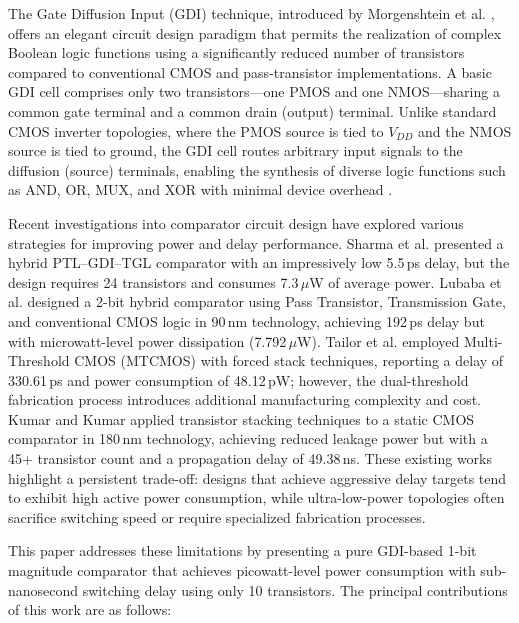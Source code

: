 \documentclass[final,5p,times,twocolumn]{elsarticle}
\begin{document}
The Gate Diffusion Input (GDI) technique, introduced by Morgenshtein et al. \cite{morgenshtein2002}, offers an elegant circuit design paradigm that permits the realization of complex Boolean logic functions using a significantly reduced number of transistors compared to conventional CMOS and pass-transistor implementations. A basic GDI cell comprises only two transistors---one PMOS and one NMOS---sharing a common gate terminal and a common drain (output) terminal. Unlike standard CMOS inverter topologies, where the PMOS source is tied to $V_{DD}$ and the NMOS source is tied to ground, the GDI cell routes arbitrary input signals to the diffusion (source) terminals, enabling the synthesis of diverse logic functions such as AND, OR, MUX, and XOR with minimal device overhead \cite{morgenshtein2002,morgenshtein2014}.

Recent investigations into comparator circuit design have explored various strategies for improving power and delay performance. Sharma et al. \cite{sharma2025} presented a hybrid PTL--GDI--TGL comparator with an impressively low 5.5\,ps delay, but the design requires 24 transistors and consumes 7.3\,$\mu$W of average power. Lubaba et al. \cite{lubaba2020} designed a 2-bit hybrid comparator using Pass Transistor, Transmission Gate, and conventional CMOS logic in 90\,nm technology, achieving 192\,ps delay but with microwatt-level power dissipation (7.792\,$\mu$W). Tailor et al. \cite{tailor2019} employed Multi-Threshold CMOS (MTCMOS) with forced stack techniques, reporting a delay of 330.61\,ps and power consumption of 48.12\,pW; however, the dual-threshold fabrication process introduces additional manufacturing complexity and cost. Kumar and Kumar \cite{kumar2017} applied transistor stacking techniques to a static CMOS comparator in 180\,nm technology, achieving reduced leakage power but with a 45+ transistor count and a propagation delay of 49.38\,ns. These existing works highlight a persistent trade-off: designs that achieve aggressive delay targets tend to exhibit high active power consumption, while ultra-low-power topologies often sacrifice switching speed or require specialized fabrication processes.

This paper addresses these limitations by presenting a pure GDI-based 1-bit magnitude comparator that achieves picowatt-level power consumption with sub-nanosecond switching delay using only 10 transistors. The principal contributions of this work are as follows:
\end{document}
